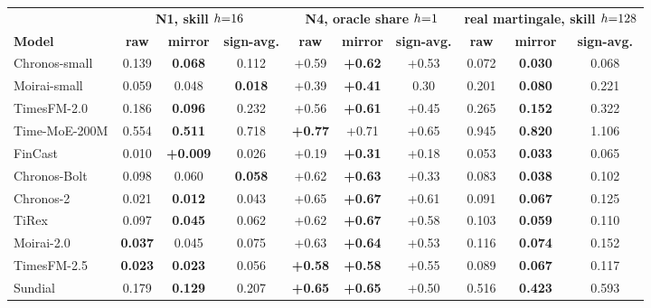 \begin{tabular}{l|ccc|ccc|ccc}
\toprule
 & \multicolumn{3}{c|}{\textbf{N1, skill $h{=}\text{\upshape 16}$}} & \multicolumn{3}{c|}{\textbf{N4, oracle share $h{=}\text{\upshape 1}$}} & \multicolumn{3}{c}{\textbf{real martingale, skill $h{=}\text{\upshape 128}$}} \\
\textbf{Model} & \textbf{raw} & \textbf{mirror} & \textbf{sign-avg.} & \textbf{raw} & \textbf{mirror} & \textbf{sign-avg.} & \textbf{raw} & \textbf{mirror} & \textbf{sign-avg.} \\
\midrule
Chronos-small & \textminus{}0.139 & \textbf{\textminus{}0.068} & \textminus{}0.112 & +0.59 & \textbf{+0.62} & +0.53 & \textminus{}0.072 & \textbf{\textminus{}0.030} & \textminus{}0.068 \\
Moirai-small & \textminus{}0.059 & \textminus{}0.048 & \textbf{\textminus{}0.018} & +0.39 & \textbf{+0.41} & \textminus{}0.30 & \textminus{}0.201 & \textbf{\textminus{}0.080} & \textminus{}0.221 \\
TimesFM-2.0 & \textminus{}0.186 & \textbf{\textminus{}0.096} & \textminus{}0.232 & +0.56 & \textbf{+0.61} & +0.45 & \textminus{}0.265 & \textbf{\textminus{}0.152} & \textminus{}0.322 \\
Time-MoE-200M & \textminus{}0.554 & \textbf{\textminus{}0.511} & \textminus{}0.718 & \textbf{+0.77} & +0.71 & +0.65 & \textminus{}0.945 & \textbf{\textminus{}0.820} & \textminus{}1.106 \\
FinCast & \textminus{}0.010 & \textbf{+0.009} & \textminus{}0.026 & +0.19 & \textbf{+0.31} & +0.18 & \textminus{}0.053 & \textbf{\textminus{}0.033} & \textminus{}0.065 \\
Chronos-Bolt & \textminus{}0.098 & \textminus{}0.060 & \textbf{\textminus{}0.058} & +0.62 & \textbf{+0.63} & +0.33 & \textminus{}0.083 & \textbf{\textminus{}0.038} & \textminus{}0.102 \\
Chronos-2 & \textminus{}0.021 & \textbf{\textminus{}0.012} & \textminus{}0.043 & +0.65 & \textbf{+0.67} & +0.61 & \textminus{}0.091 & \textbf{\textminus{}0.067} & \textminus{}0.125 \\
TiRex & \textminus{}0.097 & \textbf{\textminus{}0.045} & \textminus{}0.062 & +0.62 & \textbf{+0.67} & +0.58 & \textminus{}0.103 & \textbf{\textminus{}0.059} & \textminus{}0.110 \\
Moirai-2.0 & \textbf{\textminus{}0.037} & \textminus{}0.045 & \textminus{}0.075 & +0.63 & \textbf{+0.64} & +0.53 & \textminus{}0.116 & \textbf{\textminus{}0.074} & \textminus{}0.152 \\
TimesFM-2.5 & \textbf{\textminus{}0.023} & \textbf{\textminus{}0.023} & \textminus{}0.056 & \textbf{+0.58} & \textbf{+0.58} & +0.55 & \textminus{}0.089 & \textbf{\textminus{}0.067} & \textminus{}0.117 \\
Sundial & \textminus{}0.179 & \textbf{\textminus{}0.129} & \textminus{}0.207 & \textbf{+0.65} & \textbf{+0.65} & +0.50 & \textminus{}0.516 & \textbf{\textminus{}0.423} & \textminus{}0.593 \\
\bottomrule
\end{tabular}
